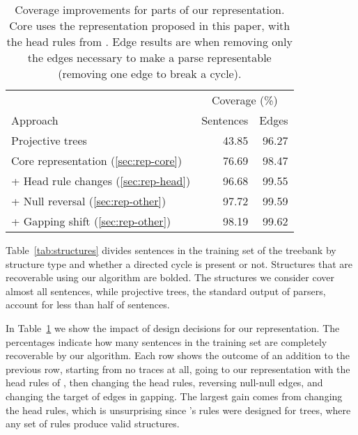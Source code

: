 \begin{table}
\centering
  \vspace{2mm}
  \begin{tabular}{|lrr|}
    \hline
    & \multicolumn{2}{c}{Coverage (\%)} \\
    Approach & Sentences & Edges \\
    \hline
    \hline
    Projective trees & 43.85 & 96.27 \\
    Core representation (\ref{sec:rep-core}) & 76.69 & 98.47 \\
    + Head rule changes (\ref{sec:rep-head}) & 96.68 & 99.55 \\
    + Null reversal (\ref{sec:rep-other}) & 97.72 & 99.59 \\
    + Gapping shift (\ref{sec:rep-other}) & 98.19 & 99.62 \\
    \hline
  \end{tabular}
  \caption{\label{tab:coverage}
    Coverage improvements for parts of our representation.
    Core uses the representation proposed in this paper, with the head rules from \textcite{cck}.
    Edge results are when removing only the edges necessary to make a parse representable (\myeg removing one edge to break a cycle).
  }
\end{table}

Table~\ref{tab:structures} divides sentences in the training set of the treebank by structure type and whether a directed cycle is present or not.
Structures that are recoverable using our algorithm are bolded.
The structures we consider cover almost all sentences, while projective trees, the standard output of parsers, account for less than half of sentences.

In Table~\ref{tab:coverage} we show the impact of design decisions for our representation.
The percentages indicate how many sentences in the training set are completely recoverable by our algorithm.
Each row shows the outcome of an addition to the previous row, starting from no traces at all, going to our representation with the head rules of \textcite{cck}, then changing the head rules, reversing null-null edges, and changing the target of edges in gapping.
The largest gain comes from changing the head rules, which is unsurprising since \textcite{cck}'s rules were designed for trees, where any set of rules produce valid structures.

